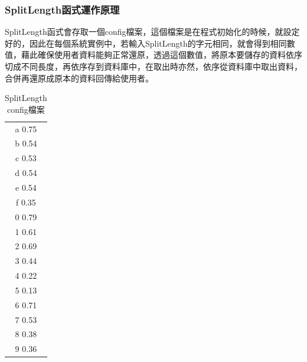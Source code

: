 \documentclass[11pt,twocolumn]{article}
\begin{document}
\subsubsection{SplitLength函式運作原理}
SplitLength函式會存取一個config檔案，這個檔案是在程式初始化的時候，就設定好的，因此在每個系統實例中，若輸入SplitLength的字元相同，就會得到相同數值，藉此確保使用者資料能夠正常還原，透過這個數值，將原本要儲存的資料依序切成不同長度，再依序存到資料庫中，在取出時亦然，依序從資料庫中取出資料，合併再還原成原本的資料回傳給使用者。\par
\begin{table}[h]
    \centering
    \begin{tabular}{ c }
    \hline
    a 0.75\\
	b 0.54\\
	c 0.53\\
	d 0.54\\
	e 0.54\\
	f 0.35\\
	0 0.79\\
	1 0.61\\
	2 0.69\\
	3 0.44\\
	4 0.22\\
	5 0.13\\
	6 0.71\\
	7 0.53\\
	8 0.38\\
	9 0.36\\
	\hline
    \end{tabular}
    \caption{SplitLength config檔案}
\end{table}
\end{document}
